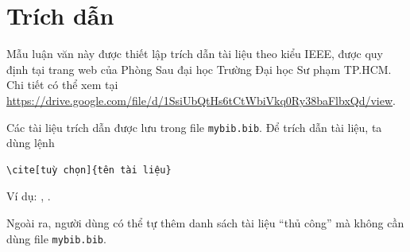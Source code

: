 \section{Trích dẫn}
Mẫu luận văn này được thiết lập trích dẫn tài liệu theo kiểu IEEE, được quy định tại trang web của Phòng Sau đại học Trường Đại học Sư phạm TP.HCM. Chi tiết có thể xem tại \\
\url{https://drive.google.com/file/d/1SsiUbQtHs6tCtWbiVkq0Ry38baFlbxQd/view}.

Các tài liệu trích dẫn được lưu trong file {\tt mybib.bib}. Để trích dẫn tài liệu, ta dùng lệnh
\begin{verbatim} 
\cite[tuỳ chọn]{tên tài liệu}
\end{verbatim}
Ví dụ: \cite{Reference1}, \cite[Theorem 1.1]{Reference2}.

Ngoài ra, người dùng có thể tự thêm danh sách tài liệu ``thủ công'' mà không cần dùng file {\tt mybib.bib}.




